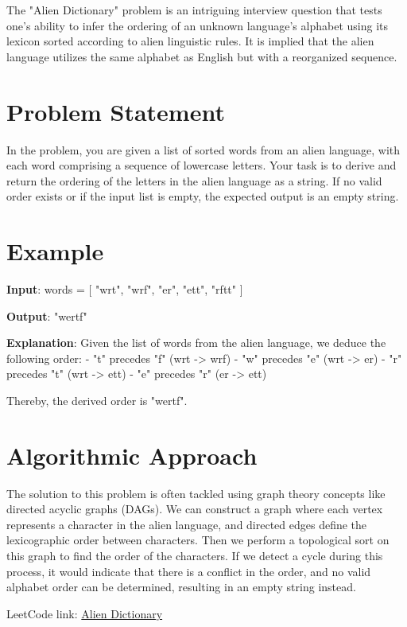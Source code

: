 
\label{problem:alien_dictionary}
The "Alien Dictionary" problem is an intriguing interview question that tests one's ability to infer the ordering of an unknown language's alphabet using its lexicon sorted according to alien linguistic rules. It is implied that the alien language utilizes the same alphabet as English but with a reorganized sequence.

\section*{Problem Statement}
In the problem, you are given a list of sorted words from an alien language, with each word comprising a sequence of lowercase letters. Your task is to derive and return the ordering of the letters in the alien language as a string. If no valid order exists or if the input list is empty, the expected output is an empty string.

\section*{Example}
\textbf{Input}:
words = [
  "wrt",
  "wrf",
  "er",
  "ett",
  "rftt"
]

\textbf{Output}: "wertf"

\textbf{Explanation}:
Given the list of words from the alien language, we deduce the following order:
- "t" precedes "f" (wrt -> wrf)
- "w" precedes "e" (wrt -> er)
- "r" precedes "t" (wrt -> ett)
- "e" precedes "r" (er -> ett)

Thereby, the derived order is "wertf".

\section*{Algorithmic Approach}
The solution to this problem is often tackled using graph theory concepts like directed acyclic graphs (DAGs). We can construct a graph where each vertex represents a character in the alien language, and directed edges define the lexicographic order between characters. Then we perform a topological sort on this graph to find the order of the characters. If we detect a cycle during this process, it would indicate that there is a conflict in the order, and no valid alphabet order can be determined, resulting in an empty string instead.

LeetCode link: \href{https://leetcode.com/problems/alien-dictionary/}{Alien Dictionary}


